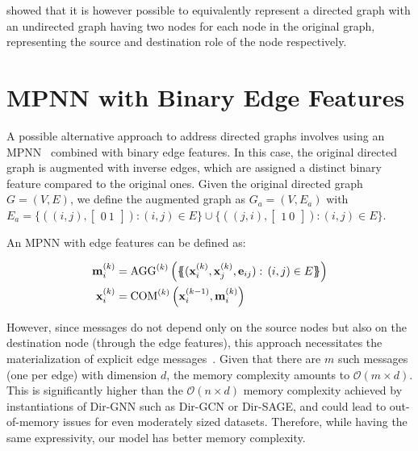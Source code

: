 \documentclass{article}
\newcommand\oursacro{Dir-GNN}
\newcommand\m{m}
\newcommand\ilayer{k}
\newcommand*{\ldblbrace}{\{\mskip-6mu\{}
\newcommand*{\rdblbrace}{\}\mskip-6mu\}}
\theoremstyle{plain}
\theoremstyle{definition}
\theoremstyle{remark}
\begin{document}
\citet{Kollias2022DirectedGA} showed that it is however possible to equivalently represent a directed graph with an undirected graph having two nodes for each node in the original graph, representing the source and destination role of the node respectively.

\section{MPNN with Binary Edge Features} \label{sec:mpnn_binary_features}
A possible alternative approach to address directed graphs involves using an MPNN~\cite{gilmer2017neural} combined with binary edge features. In this case, the original directed graph is augmented with inverse edges, which are assigned a distinct binary feature compared to the original ones. Given the original directed graph $G=(V, E)$, we define the augmented graph as $G_a=(V, E_a)$ with $E_a= \{ ((i, j), \begin{bmatrix} 0 \ 1 \end{bmatrix} ) : (i, j) \in E \} \cup \{ ((j, i), \begin{bmatrix} 1 \ 0 \end{bmatrix} ) : (i, j) \in E \} $.

An MPNN with edge features can be defined as:

\begin{align*}
    \mathbf{\m}^{(\ilayer)}_{i} &=  \mathrm{AGG}^{(\ilayer)}\left(\ldblbrace (\mathbf{x}_{i}^{(\ilayer)}, \mathbf{x}_{j}^{(\ilayer)}, \mathbf{e}_{ij}):\, (i,j)\in E \rdblbrace \right) \notag \\
    \mathbf{x}_{i}^{(\ilayer)}   &=  \mathrm{COM}^{(\ilayer)}\left(\mathbf{x}_i^{(\ilayer-1)}, \mathbf{\m}^{(\ilayer)}_i\right) 
\end{align*}

However, since messages do not depend only on the source nodes but also on the destination node (through the edge features), this approach necessitates the materialization of explicit edge messages~\cite{tailor2022adaptive}. Given that there are $m$ such messages (one per edge) with dimension $d$, the memory complexity amounts to $\mathcal{O}(m \times d)$. This is significantly higher than the $\mathcal{O}(n \times d)$ memory complexity achieved by instantiations of \oursacro{} such as Dir-GCN or Dir-SAGE, and could lead to out-of-memory issues for even moderately sized datasets. Therefore, while having the same expressivity, our model has better memory complexity. 
\end{document}
